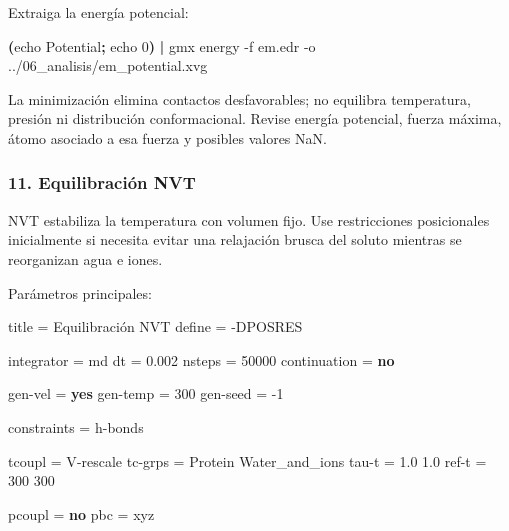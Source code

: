 \documentclass[
  spanish,
  11pt,
  a4paper]{article}
\newenvironment{Shaded}{\begin{snugshade}}{\end{snugshade}}
\newcommand{\AttributeTok}[1]{\textcolor[rgb]{0.13,0.29,0.53}{#1}}
\newcommand{\BuiltInTok}[1]{#1}
\newcommand{\DataTypeTok}[1]{\textcolor[rgb]{0.13,0.29,0.53}{#1}}
\newcommand{\DecValTok}[1]{\textcolor[rgb]{0.00,0.00,0.81}{#1}}
\newcommand{\ExtensionTok}[1]{#1}
\newcommand{\FloatTok}[1]{\textcolor[rgb]{0.00,0.00,0.81}{#1}}
\newcommand{\KeywordTok}[1]{\textcolor[rgb]{0.13,0.29,0.53}{\textbf{#1}}}
\newcommand{\NormalTok}[1]{#1}
\newcommand{\OtherTok}[1]{\textcolor[rgb]{0.56,0.35,0.01}{#1}}
\newcommand{\StringTok}[1]{\textcolor[rgb]{0.31,0.60,0.02}{#1}}
\begin{document}
Extraiga la energía potencial:

\begin{Shaded}
\begin{Highlighting}[]
\KeywordTok{(}\BuiltInTok{echo}\NormalTok{ Potential}\KeywordTok{;} \BuiltInTok{echo}\NormalTok{ 0}\KeywordTok{)} \KeywordTok{|}
\ExtensionTok{gmx}\NormalTok{ energy     }\AttributeTok{{-}f}\NormalTok{ em.edr     }\AttributeTok{{-}o}\NormalTok{ ../06\_analisis/em\_potential.xvg}
\end{Highlighting}
\end{Shaded}

La minimización elimina contactos desfavorables; no equilibra
temperatura, presión ni distribución conformacional. Revise energía
potencial, fuerza máxima, átomo asociado a esa fuerza y posibles valores
NaN.

\subsubsection{11. Equilibración NVT}\label{equilibraciuxf3n-nvt-1}

NVT estabiliza la temperatura con volumen fijo. Use restricciones
posicionales inicialmente si necesita evitar una relajación brusca del
soluto mientras se reorganizan agua e iones.

Parámetros principales:

\begin{Shaded}
\begin{Highlighting}[]
\DataTypeTok{title         }\OtherTok{=}\StringTok{ Equilibración NVT}
\DataTypeTok{define        }\OtherTok{=}\StringTok{ {-}DPOSRES}

\DataTypeTok{integrator    }\OtherTok{=}\StringTok{ md}
\DataTypeTok{dt            }\OtherTok{=}\StringTok{ }\FloatTok{0.002}
\DataTypeTok{nsteps        }\OtherTok{=}\StringTok{ }\DecValTok{50000}
\DataTypeTok{continuation  }\OtherTok{=}\StringTok{ }\KeywordTok{no}

\DataTypeTok{gen{-}vel       }\OtherTok{=}\StringTok{ }\KeywordTok{yes}
\DataTypeTok{gen{-}temp      }\OtherTok{=}\StringTok{ }\DecValTok{300}
\DataTypeTok{gen{-}seed      }\OtherTok{=}\StringTok{ }\DecValTok{{-}1}

\DataTypeTok{constraints   }\OtherTok{=}\StringTok{ h{-}bonds}

\DataTypeTok{tcoupl        }\OtherTok{=}\StringTok{ V{-}rescale}
\DataTypeTok{tc{-}grps       }\OtherTok{=}\StringTok{ Protein Water\_and\_ions}
\DataTypeTok{tau{-}t         }\OtherTok{=}\StringTok{ 1.0 1.0}
\DataTypeTok{ref{-}t         }\OtherTok{=}\StringTok{ 300 300}

\DataTypeTok{pcoupl        }\OtherTok{=}\StringTok{ }\KeywordTok{no}
\DataTypeTok{pbc           }\OtherTok{=}\StringTok{ xyz}
\end{Highlighting}
\end{Shaded}
\end{document}
